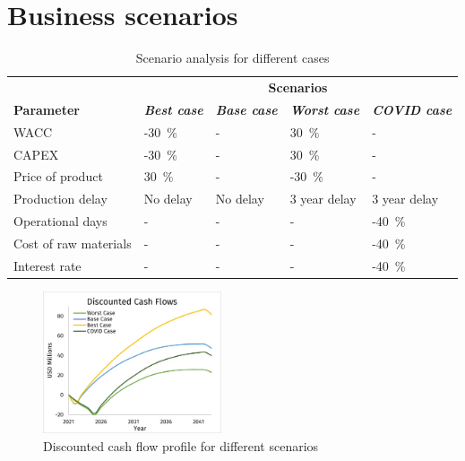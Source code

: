 
\section{Business scenarios}

\begin{table}[H]
\centering
\caption{Scenario analysis for different cases}
\label{scenario_analysis}
\begin{tabular}{l|llll}
\toprule
                      & \multicolumn{4}{c}{\textbf{Scenarios}}                                                        \\
\textbf{Parameter}    & \textit{\textbf{Best case}} & \textit{\textbf{Base case}} & \textit{\textbf{Worst case}} & \textit{\textbf{COVID case}} \\ \midrule
WACC                  & -\SI{30}{\percent}                       & -                          & \SI{30}{\percent}                         & -                            \\
CAPEX                 & -\SI{30}{\percent}                       & -                          & \SI{30}{\percent}                         & -                            \\
Price of product      & \SI{30}{\percent}                        & -                          & -\SI{30}{\percent}                        & -                            \\
Production delay      & No delay                    & No delay                   & 3 year delay                 & 3 year delay                 \\
Operational days      & -                           & -                          & -                            & -\SI{40}{\percent}                        \\
Cost of raw materials & -                           & -                          & -                            & -\SI{40}{\percent}                        \\
Interest rate         & -                           & -                          & -                            & -\SI{40}{\percent}                        \\\bottomrule
\end{tabular}
\end{table}

\begin{figure}
    \caption{Discounted cash flow profile for different scenarios}
    \label{DCF_scenario}
    \includegraphics[width=0.47\textwidth]{chapters/6-economics/figures/DCF.jpg}
\end{figure}

